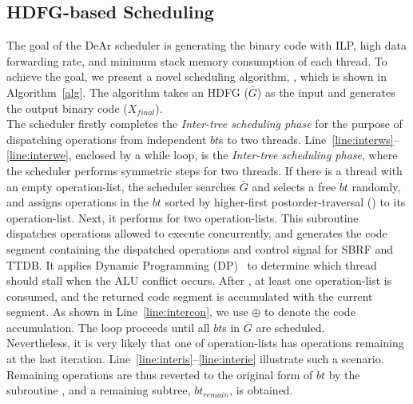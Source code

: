 \subsection{HDFG-based Scheduling}
\label{sec:scheduling}
The goal of the DeAr scheduler is generating the binary code with ILP, high data forwarding rate, 
and minimum stack memory consumption of each thread.
To achieve the goal, we present a novel scheduling algorithm, 
, which is shown in Algorithm~\ref{alg}.
The algorithm takes an HDFG ($\bar{G}$) as the input and generates the output binary code ($X_{final}$).
\\\indent
The scheduler firstly completes the \textit{Inter-tree scheduling phase}
for the purpose of dispatching operations from independent $bt$s to two threads.
Line~\ref{line:interws}--\ref{line:interwe}, enclosed by a while loop, is the \textit{Inter-tree scheduling phase}, 
where the scheduler performs symmetric steps for two threads.
If there is a thread with an empty operation-list, 
the scheduler searches $\bar{G}$ and selects a free $bt$ randomly, 
and assigns operations in the $bt$ sorted by higher-first postorder-traversal () to its operation-list.
Next, it performs  for two operation-lists.
This subroutine dispatches operations allowed to execute concurrently, 
and generates the code segment containing the dispatched operations and control signal for SBRF and TTDB.
It applies Dynamic Programming (DP)~\cite{dp} to determine which thread should stall when the ALU conflict occurs.
After , at least one operation-list is consumed, 
and the returned code segment is accumulated with the current segment.
As shown in Line~\ref{line:intercon}, we use $\oplus$ to denote the code accumulation.
The loop proceeds until all $bt$s in $\bar{G}$ are scheduled.
\\\indent
Nevertheless, it is very likely that one of operation-lists has operations remaining at the last iteration.
Line~\ref{line:interis}--\ref{line:interie} illustrate such a scenario.
Remaining operations are thus reverted to the original form of $bt$ by the subroutine ,
and a remaining subtree, $bt_{remain}$, is obtained.%
\\\indent
